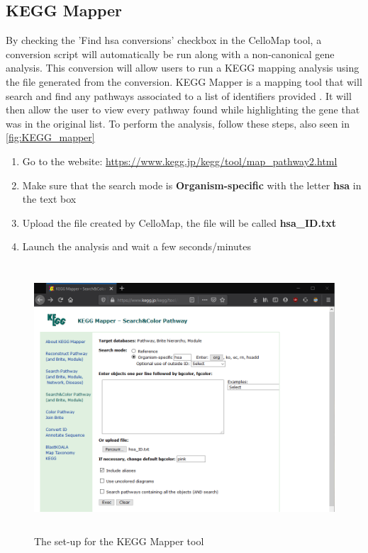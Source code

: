 \documentclass[11pt]{article}
\begin{document}
\subsection{KEGG Mapper \label{KEGG Map}}
By checking the 'Find hsa conversions' checkbox in the CelloMap tool, a conversion script will automatically be run along with a non-canonical gene analysis. This conversion will allow users to run a KEGG mapping analysis using the file generated from the conversion.
KEGG Mapper is a mapping tool that will search and find any pathways associated to a list of identifiers provided \cite{kanehisa2019kegg}. It will then allow the user to view every pathway found while highlighting the gene that was in the original list.
To perform the analysis, follow these steps, also seen in \autoref{fig:KEGG_mapper}
\begin{enumerate}
\item Go to the website: \url{https://www.kegg.jp/kegg/tool/map_pathway2.html}
\item Make sure that the search mode is \textbf{Organism-specific} with the letter \textbf{hsa} in the text box
\item Upload the file created by CelloMap, the file will be called \textbf{hsa\_ID.txt} 
\item Launch the analysis and wait a few seconds/minutes
\end{enumerate}

\begin{figure}[h!]
\centering
\includegraphics[width=15cm,height=10cm,keepaspectratio]{KEGG_Mapper.png}
\caption{The set-up for the KEGG Mapper tool}
\label{fig:KEGG_mapper}
\end{figure}
\end{document}
